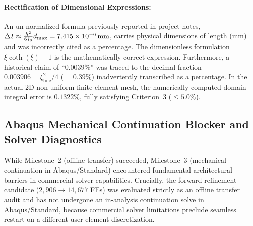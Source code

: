 \paragraph{Rectification of Dimensional Expressions:}
An un-normalized formula previously reported in project notes, $\Delta I \approx \frac{h^2}{6\,l_0} d_{\max} = 7.415 \times 10^{-6}\,\mathrm{mm}$, carries physical dimensions of length ($\mathrm{mm}$) and was incorrectly cited as a percentage. The dimensionless formulation $\xi \coth(\xi) - 1$ is the mathematically correct expression. Furthermore, a historical claim of ``$0.0039\%$'' was traced to the decimal fraction $0.003906 = \xi_{\mathrm{fine}}^2 / 4$ ($= 0.39\%$) inadvertently transcribed as a percentage. In the actual 2D non-uniform finite element mesh, the numerically computed domain integral error is $0.1322\%$, fully satisfying Criterion~3 ($\le 5.0\%$).

\subsection{Abaqus Mechanical Continuation Blocker and Solver Diagnostics}
\label{subsec:method_c_solver_blocker}

While Milestone~2 (offline transfer) succeeded, Milestone~3 (mechanical continuation in Abaqus/Standard) encountered fundamental architectural barriers in commercial solver capabilities. Crucially, the forward-refinement candidate ($2{,}906 \to 14{,}677$ FEs) was evaluated strictly as an offline transfer audit and has not undergone an in-analysis continuation solve in Abaqus/Standard, because commercial solver limitations preclude seamless restart on a different user-element discretization.

